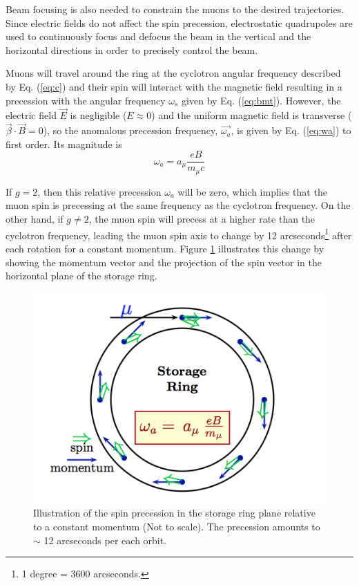 \documentclass{outhesis}
\begin{document}
Beam focusing is also needed to constrain the muons to the desired trajectories. Since electric fields do not affect the spin precession, electrostatic quadrupoles are used to continuously focus and defocus the beam in the vertical and the horizontal directions in order to precisely control the beam. 

Muons will travel around the ring at the cyclotron angular frequency described by Eq. (\ref{eq:c}) and their spin will interact with the magnetic field resulting in a precession with the angular frequency $\omega_s$ given by Eq. (\ref{eq:bmt}). However, the electric field $\overrightarrow{E}$ is negligible ($E \approx 0$) and the uniform magnetic field is transverse ($\overrightarrow{\beta} \cdot \overrightarrow{B} = 0$), so the anomalous precession frequency, $\overrightarrow{\omega_a}$, is given by Eq. (\ref{eq:wa}) to first order. Its magnitude is  
\begin{equation}
\omega_a =   a_{\mu}\frac{eB}{m_{\mu}c} 
\label{eq:waa}
\end{equation}

If $g = 2$, then this relative precession $\omega_a$ will be zero, which implies that the muon spin is precessing at the same frequency as the cyclotron frequency. On the other hand, if $g \neq 2$, the muon spin will precess at a higher rate than the cyclotron frequency, leading the muon spin axis to change by 12 arcseconds\footnote{1 degree = 3600 arcseconds.} after each rotation for a constant momentum. Figure \ref{fig:ring} illustrates this change by showing the momentum vector and the projection of the spin vector in the horizontal plane of the storage ring. 
\begin{figure}
  \centering
  \includegraphics[scale=0.5]{figures/ring}
  \caption{Illustration of the spin precession in the storage ring plane relative to a constant momentum (Not to scale). The precession amounts to $\sim$ 12 arcseconds per each orbit.  \cite{phen}}
  \label{fig:ring}
\end{figure}
 
\end{document}
